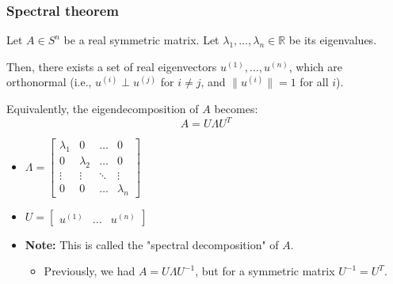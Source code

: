\subsubsection{Spectral theorem}
\begin{theorem}
    Let $A \in S^n$ be a real symmetric matrix. Let $\lambda_1, \dots, \lambda_n \in \mathbb{R}$ be its eigenvalues. 
    \vspace{1em}

    Then, there exists a set of real eigenvectors $u^{(1)}, \dots, u^{(n)}$, which are orthonormal (i.e., $u^{(i)} \perp u^{(j)}$ for $i \neq j$, and $\| u^{(i)} \| = 1$ for all $i$). 
    \vspace{1em}

    Equivalently, the eigendecomposition of $A$ becomes:
    \[
    A = U \Lambda U^T
    \]
    \begin{itemize}
        \item $\Lambda = \begin{bmatrix}
    \lambda_1 & 0 & \dots & 0 \\
    0 & \lambda_2 & \dots & 0 \\
    \vdots & \vdots & \ddots & \vdots \\
    0 & 0 & \dots & \lambda_n
    \end{bmatrix}$
    \item $U = \begin{bmatrix}
    u^{(1)} & \dots & u^{(n)}
    \end{bmatrix}$
    \item \textbf{Note:} This is called the "spectral decomposition" of $A$. 
    \begin{itemize}
        \item Previously, we had $A = U \Lambda U^{-1}$, but for a symmetric matrix $U^{-1} = U^T$.
    \end{itemize}
    \end{itemize}
\end{theorem}

